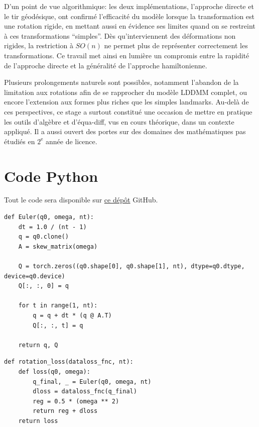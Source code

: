 \documentclass[12pt]{report}
\begin{document}
D'un point de vue algorithmique: les deux implémentations, l'approche directe et le tir géodésique, ont confirmé l'efficacité du modèle lorsque la transformation est une rotation rigide, en mettant aussi en évidence ses limites quand on se restreint à ces transformations ``simples''. Dès qu'interviennent des déformations non rigides, la restriction à $SO(n)$ ne permet plus de représenter correctement les transformations. Ce travail met ainsi en lumière un compromis entre la rapidité de l'approche directe et la généralité de l'approche hamiltonienne.

Plusieurs prolongements naturels sont possibles, notamment l'abandon de la limitation aux rotations afin de se rapprocher du modèle LDDMM complet, ou encore l'extension aux formes plus riches que les simples landmarks. Au-delà de ces perspectives, ce stage a surtout constitué une occasion de mettre en pratique les outils d'algèbre et d'équa-diff, vus en cours théorique, dans un contexte appliqué. Il a aussi ouvert des portes sur des domaines des mathématiques pas étudiés en $2^{\text{e}}$ année de licence.


\newpage




\appendix
\chapter{Code Python}

Tout le code sera disponible sur \href{https://github.com/DJ4nto/Etude_du_groupe_de_Lie_SO_dans_le_cadre_de_l-analyse_de_formes}{ce dépôt} GitHub.

\begin{lstlisting}[caption=Fonction Euler, label=code:Euler]
def Euler(q0, omega, nt):
    dt = 1.0 / (nt - 1)
    q = q0.clone()
    A = skew_matrix(omega)
    
    Q = torch.zeros((q0.shape[0], q0.shape[1], nt), dtype=q0.dtype, device=q0.device)
    Q[:, :, 0] = q
    
    for t in range(1, nt):
        q = q + dt * (q @ A.T)
        Q[:, :, t] = q
        
    return q, Q
\end{lstlisting}

\begin{lstlisting}[caption=Fonction rotation\_loss, label=code:rotation_loss]
def rotation_loss(dataloss_fnc, nt):
    def loss(q0, omega):
        q_final, _ = Euler(q0, omega, nt)
        dloss = dataloss_fnc(q_final)
        reg = 0.5 * (omega ** 2)
        return reg + dloss
    return loss
\end{lstlisting}
\end{document}
